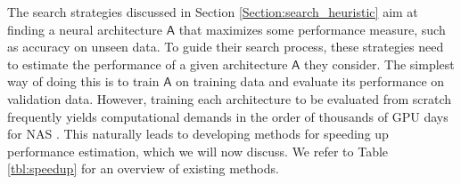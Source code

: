 \documentclass[twoside,11pt]{article}
\newcommand{\crc}[1]{#1}
\newcommand{\arch}{\mathsf{A}}
\begin{document}
The search strategies discussed in Section \ref{Section:search_heuristic} aim at finding a neural architecture $\arch$ that maximizes some performance measure, such as accuracy on unseen data. To guide their search process, these strategies need to estimate the performance of a given architecture $\arch$ they consider. The simplest way of doing this is to train $\arch$ on training data and evaluate its performance on validation data. 
However, training each architecture to be evaluated from scratch frequently yields computational demands in the order of thousands of GPU days for NAS  \citep{DBLP:journals/corr/ZophL16,DBLP:journals/corr/RealMSSSLK17,DBLP:journals/corr/ZophVSL17,real_regularized_2018}. \crc{This naturally leads to developing methods for speeding up performance estimation, which we will now discuss. We refer to Table \ref{tbl:speedup} for an overview of existing methods.}
\end{document}
